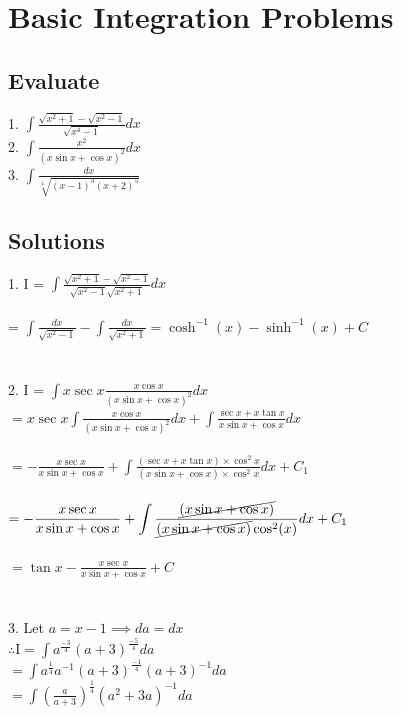 \documentclass[14pt]{article}
\begin{document}
	\section{Basic Integration Problems}
	\subsection{Evaluate}
	1. $\displaystyle \int \frac{\sqrt{x^2+1}-\sqrt{x^2-1}}{\sqrt{x^4-1}}dx$ \\
	2. $\displaystyle \int \frac{x^2}{(x\sin x+\cos x)^2}dx$ \\
	3. $\displaystyle \int \frac{dx}{\sqrt[4]{(x-1)^3(x+2)^5}}$
	\subsection{Solutions}
	1. I = $\displaystyle \int\frac{\sqrt{x^2+1}-\sqrt{x^2-1}}{\sqrt{x^2-1}\sqrt{x^2+1}}dx$ \\ \\= $\displaystyle \int\frac{dx}{\sqrt{x^2-1}} - \int\frac{dx}{\sqrt{x^2+1}} = \boxed{\cosh^{-1}(x)-\sinh^{-1}(x)+C}$ \\ \\ \\
	2. I = $\displaystyle\int x \sec x \frac{x \cos x}{(x\sin x+\cos x)^2}dx$ \\
	$\displaystyle =x \sec x \int \frac{x \cos x}{(x\sin x+\cos x)^2}dx + \int \frac{\sec x+x\tan x}{x\sin x+\cos x}dx$ \\ \\
	$\displaystyle =-\frac{x\sec x}{x\sin x+\cos x}+\int\frac{(\sec x+x\tan x)\times\cos^2 x}{(x\sin x+\cos x)\times\cos^2 x}dx+C_1$ \\ \\
	$\displaystyle =-\frac{x\sec x}{x\sin x+\cos x}+\int\frac{\cancel{(x\sin x+\cos x)}}{\cancel{(x\sin x+\cos x)}\cos^2(x)}dx+C_1$ \\ \\
	$\displaystyle = \boxed{\tan x -\frac{x\sec x}{x\sin x+\cos x}+C}$ \\ \\ \\
	3. Let $a=x-1 \implies da=dx$ \\
	$\displaystyle \therefore \text{I} = \int a^{\frac{-3}{4}} (a+3)^{\frac{-5}{4}}da$\\
	$\displaystyle = \int a^{\frac{1}{4}} a^{-1} (a+3)^{\frac{-1}{4}} (a+3)^{-1}da$\\
	$\displaystyle = \int \left(\frac{a}{a+3}\right)^{\frac{1}{4}} (a^2+3a)^{-1}da$\\
\end{document}

